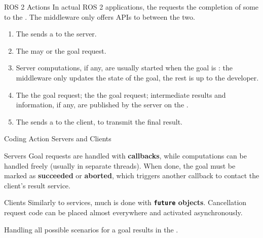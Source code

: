 \begin{frame}{ROS 2 Actions}
In actual ROS 2 applications, the  requests the completion of some  to the . The middleware only offers APIs to  between the two.
\begin{enumerate}
  \item The  sends a  to the server.
  \item The  may  or  the goal request.
  \item Server computations, if any, are usually started when the goal is : the middleware only updates the state of the goal, the rest is up to the developer.
  \item The  the goal request; the  the goal request; intermediate results and information, if any, are published by the server on the .
  \item The  sends a  to the client, to transmit the final result.
\end{enumerate}
\end{frame}

\begin{frame}{Coding Action Servers and Clients}
\begin{block}{Servers}
Goal requests are handled with \textbf{callbacks}, while computations can be handled freely (usually in separate threads). When done, the goal must be marked as \textbf{succeeded} or \textbf{aborted}, which triggers another callback to contact the client's result service.
\end{block}
\begin{block}{Clients}
Similarly to services, much is done with \textbf{\texttt{future} objects}. Cancellation request code can be placed almost everywhere and activated asynchronously.
\end{block}
Handling all possible scenarios for a goal results in the . {\Large\smiley{}}
\end{frame}

